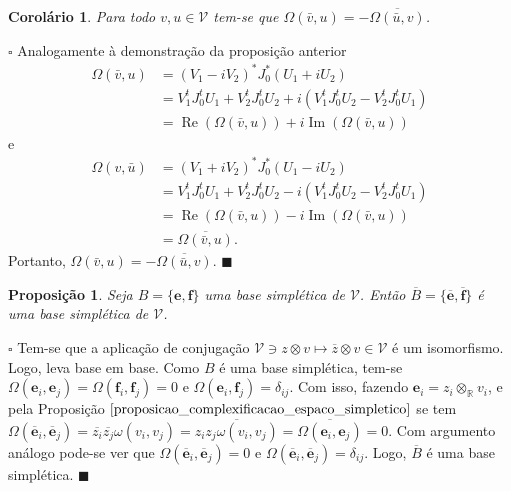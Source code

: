 \documentclass[12pt]{book}
\newtheorem{corolario}[teorema]{Corolário}
\newtheorem{proposicao}[teorema]{Proposição}
\newenvironment{prova}[1]{$\square$ #1}{\hfill$\blacksquare$}
\DeclareMathOperator{\Ima}{Im}
\DeclareMathOperator{\re}{Re}
\newcommand{\complexificado}[1]{\mathcal{#1}}
\newcommand{\complexificacaoelemento}[2]{#1\otimes_{\reta} #2}
\newcommand{\estruturacomplexa}{J_{0}}
\newcommand{\formaSimpletica}[2]{\omega(#1, #2)}
\newcommand{\formaSimpleticaExtendida}[2]{\Omega(#1, #2)}
\newcommand{\parteImaginaria}[1]{\Ima{(#1)}}
\newcommand{\parteReal}[1]{\re (#1)}
\newcommand{\real}[1]{\mathbb{R}^{#1}}
\newcommand{\reta}{\real{}}
\begin{document}
	\begin{corolario}\label{corolario_simetria_forma_simpletica}
		Para todo $v,u \in \complexificado{V}$ tem-se que $\Omega(\bar{v}, u)=-\overline{\formaSimpleticaExtendida{\bar{u}}{v}}$.
	\end{corolario}
	\begin{prova}
		Analogamente à demonstração da proposição anterior
		$$
			\begin{aligned}
				\formaSimpleticaExtendida{\bar{v}}{u}&= (V_{1}-iV_{2})^{*}\estruturacomplexa^{*} (U_{1}+iU_{2})
				\\
				&= V_{1}^{t}\estruturacomplexa^{t} U_{1} +V_{2}^{t}\estruturacomplexa^{t} U_{2}+i( V_{1}^{t}\estruturacomplexa^{t} U_{2} - V_{2}^{t}\estruturacomplexa^{t} U_{1})
				\\
				&=\parteReal{\formaSimpleticaExtendida{\bar{v}}{u}} +i\parteImaginaria{\formaSimpleticaExtendida{\bar{v}}{u}}
			\end{aligned}
		$$
		e
		$$
		\begin{aligned}
		\formaSimpleticaExtendida{v}{\bar{u}}
		&= (V_{1}+iV_{2})^{*}\estruturacomplexa^{*} (U_{1}-iU_{2})
		\\
		&= V_{1}^{t}\estruturacomplexa^{t} U_{1} +V_{2}^{t}\estruturacomplexa^{t} U_{2}-i( V_{1}^{t}\estruturacomplexa^{t} U_{2} - V_{2}^{t}\estruturacomplexa^{t} U_{1})
		\\
		&=\parteReal{\formaSimpleticaExtendida{\bar{v}}{u}} -i\parteImaginaria{\formaSimpleticaExtendida{\bar{v}}{u}}
		\\
		&=\overline{\formaSimpleticaExtendida{\bar{v}}{u}}.
		\end{aligned}
		$$
		Portanto, $\formaSimpleticaExtendida{\bar{v}}{u}=-\overline{\formaSimpleticaExtendida{\bar{u}}{v}}$.
	\end{prova}
	
	\begin{proposicao}\label{proposicao_base_simpletica_conjugada}
		Seja $B=\{\textbf{e}, \textbf{f} \}$ uma base simplética de $\complexificado{V}$. Então $\overline{B}=\{\overline{\textbf{e}}, \overline{\textbf{f}}\}$ é uma base simplética de $\complexificado{V}$.
	\end{proposicao}
	\begin{prova}
		Tem-se que a aplicação de conjugação $\complexificado{V} \ni z\otimes v \mapsto \overline{z}\otimes v \in \complexificado{V}$ é um isomorfismo. Logo, leva base em base. Como $B$ é uma base simplética, tem-se $\Omega(\textbf{e}_{i}, \textbf{e}_{j}) = \Omega(\textbf{f}_{i}, \textbf{f}_{j}) =0$ e $\Omega(\textbf{e}_{i}, \textbf{f}_{j}) = \delta_{ij}$. Com isso, fazendo $\textbf{e}_{i} = \complexificacaoelemento{z_{i}}{v_{i}}$, e pela Proposição $\ref{proposicao_complexificacao_espaco_simpletico}$ se tem $\Omega(\overline{\textbf{e}}_{i}, \overline{\textbf{e}}_{j}) =	\overline{z_{i}}\overline{z_{j}}\formaSimpletica{v_{i}}{v_{j}}=\overline{z_{i}z_{j}\formaSimpletica{v_{i}}{v_{j}}} = \overline{\Omega(\textbf{e}_{i}, \textbf{e}_{j})} = 0$. Com argumento análogo pode-se ver que $\Omega(\overline{\textbf{e}}_{i}, \overline{\textbf{e}}_{j}) =0$ e $\Omega(\overline{\textbf{e}}_{i}, \overline{\textbf{e}}_{j}) =\delta_{ij}$. Logo, $\overline{B}$ é uma base simplética.
	\end{prova}
	
\end{document}
